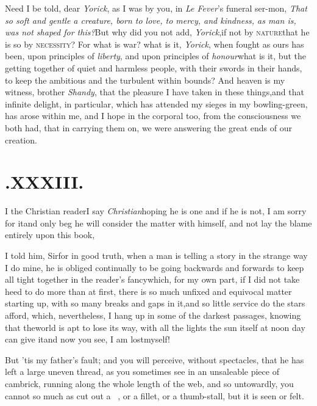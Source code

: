 \documentclass{article}
\begin{document}
Need I be told, dear \textit{Yorick}, as I was by you, in \textit{Le
Fever}’s funeral ser-\pb mon, \textit{That so soft and gentle a
creature, born to love, to mercy, and kindness, as man is, was not
shaped for this?}\tsh But why did you not add,
\textit{Yorick},\tsk if not by \textsc{nature}\tsk that he
is so by \textsc{necessity}?\break
\tsh For what is war?
what is it, \textit{Yorick}, when fought as ours has been, upon
principles of \textit{liberty}, and upon principles of
\textit{honour}\tsk what is it, but the getting together of quiet
and harmless people, with their swords in their hands, to keep the
ambitious and the turbulent within bounds? And heaven is my
witness, brother \textit{Shandy}, that the pleasure I have taken in
these things,\tsk and that infinite delight, in particular, which
has attended my sieges in my bowling-green, has arose within me,
and I hope in the corporal too, from the consciousness we both had,
that in carrying them on, we were answering the great ends of our\break
creation.

\newpage
\section{.\enspace XXXIII.}

\lettrine{I}{ } the Christian reader\tsk I
say\break
\textit{Christian}\tsh hoping he is one\tsh\break
and if he is not, I am sorry for it\tsh and only beg he will consider the matter
with himself, and not lay the blame entirely upon this book,\tsh

I told him, Sir\tsh for in good truth, when a man is
telling a story in the strange way I do mine, he is obliged
continually to be going backwards and forwards to keep all tight
together in the reader’s fancy\tsh which, for my own
part, if I did not take heed to do more than at first, there is so
much unfixed and equivocal matter starting up, with so many breaks
and gaps in it,\tsk and so little service do the stars afford,
which, nevertheless, I hang up in some of the darkest passages,
knowing that the\pb world is apt to lose its way, with all the lights
the sun itself at noon day can give it\tsh and now you
see, I am lost\break myself!\tsh

\tsh But ’tis my father’s fault; and\break
{}\break you will perceive, without
spectacles, that he has left a large uneven thread, as you
sometimes see in an unsaleable piece of cambrick, running along the
whole length of the web, and so untowardly, you cannot so much as
cut out a \lower-2pt\hbox{\small\ast\ \ast},\break
{}\break
\tsh or a fillet, or a thumb-stall, but it is seen
or felt.\tsh
\end{document}
